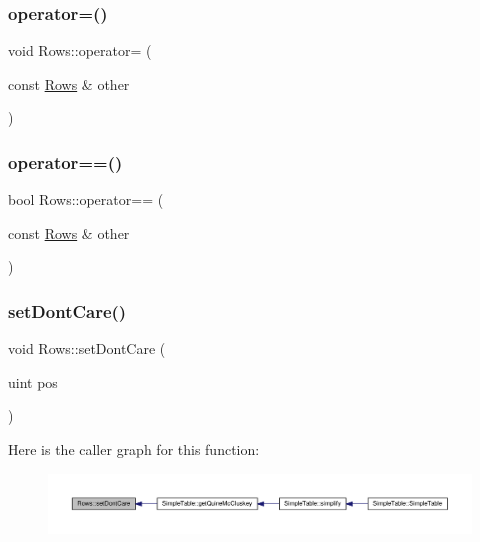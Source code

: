 \mbox{\label{class_rows_a050e6e5b47e4096f1cdea7f7325fac8e}} 
\subsubsection{\texorpdfstring{operator=()}{operator=()}}
{\footnotesize\ttfamily void Rows\+::operator= (\begin{DoxyParamCaption}\item[{const \hyperlink{class_rows}{Rows} \&}]{other }\end{DoxyParamCaption})}

\mbox{\label{class_rows_a234bd8fcbb772dad8a6e129c2ccd0e8b}} 
\subsubsection{\texorpdfstring{operator==()}{operator==()}}
{\footnotesize\ttfamily bool Rows\+::operator== (\begin{DoxyParamCaption}\item[{const \hyperlink{class_rows}{Rows} \&}]{other }\end{DoxyParamCaption})}

\mbox{\label{class_rows_a7f0b421443b1c6141c8816a7bfd1ac75}} 
\subsubsection{\texorpdfstring{set\+Dont\+Care()}{setDontCare()}}
{\footnotesize\ttfamily void Rows\+::set\+Dont\+Care (\begin{DoxyParamCaption}\item[{uint}]{pos }\end{DoxyParamCaption})}

Here is the caller graph for this function\+:\nopagebreak
\begin{figure}[H]
\begin{center}
\leavevmode
\includegraphics[width=350pt]{d6/d54/class_rows_a7f0b421443b1c6141c8816a7bfd1ac75_icgraph}
\end{center}
\end{figure}
\mbox{\label{class_rows_aa610ff44d051eededf3c25928987bb81}} 
